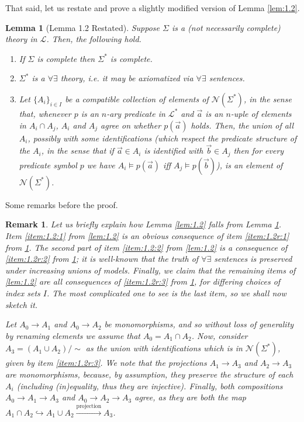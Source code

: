 \documentclass{article}
\newtheorem{lemma}[theorem]{Lemma}
\newtheorem{remark}[theorem]{Remark}
\theoremstyle{nonumberplain}
\newcommand{\Lang}{\mathcal{L}}
\newcommand{\calN}{\mathcal{N}}
\begin{document}
That said, let us restate and prove a slightly modified version of Lemma \ref{lem:1.2}.

\begin{lemma}[Lemma 1.2 Restated]\label{lem:1.2r}
Suppose $\Sigma$ is a (not necessarily complete) theory in $\Lang$. Then, the following hold.
\begin{enumerate}
\item\label{item:1.2r:1} If $\Sigma$ is complete then $\Sigma^*$ is complete.
\item\label{item:1.2r:2} $\Sigma^*$ is a $\forall \exists$ theory, i.e. it may be axiomatized via $\forall\exists$ sentences.
\item\label{item:1.2r:3} Let $\{A_i\}_{i \in I}$ be a compatible collection of elements of $\calN(\Sigma^*)$, in the sense that, whenever $p$ is an $n$-ary predicate in $\Lang^*$ and $\vec a$ is an $n$-uple of elements in $A_i \cap A_j$, $A_i$ and $A_j$ agree on whether $p(\vec a)$ holds. Then, the union of all $A_i$, possibly with some identifications (which respect the predicate structure of the $A_i$, in the sense that if $\vec a \in A_i$ is identified with $\vec b \in A_j$ then for every predicate symbol $p$ we have $A_i \vDash p(\vec a)$ iff $A_j \vDash p(\vec b)$), is an element of $\calN(\Sigma^*)$.
\end{enumerate}
\end{lemma}

Some remarks before the proof.

\begin{remark}
Let us briefly explain how Lemma \ref{lem:1.2} falls from Lemma \ref{lem:1.2r}. Item \ref{item:1.2:1} from \ref{lem:1.2} is an obvious consequence of item \ref{item:1.2r:1} from \ref{lem:1.2r}. The second part of item \ref{item:1.2:2} from \ref{lem:1.2} is a consequence of \ref{item:1.2r:2} from \ref{lem:1.2r}; it is well-known that the truth of $\forall\exists$ sentences is preserved under increasing unions of models. Finally, we claim that the remaining items of \ref{lem:1.2} are all consequences of \ref{item:1.2r:3} from \ref{lem:1.2r}, for differing choices of index sets $I$. The most complicated one to see is the last item, so we shall now sketch it.

Let $A_0 \to A_1$ and $A_0 \to A_2$ be monomorphisms, and so without loss of generality by renaming elements we assume that $A_0 = A_1 \cap A_2$. Now, consider $A_3 = (A_1 \cup A_2)/\sim$ as the union with identifications which is in $\calN(\Sigma^*)$, given by item \ref{item:1.2r:3}. We note that the projections $A_1 \to A_3$ and $A_2 \to A_3$ are monomorphisms, because, by assumption, they preserve the structure of each $A_i$ (including (in)equality, thus they are injective). Finally, both compositions $A_0 \to A_1 \to A_3$ and $A_0 \to A_2 \to A_3$ agree, as they are both the map ${A_1 \cap A_2 \hookrightarrow A_1 \cup A_2 \xrightarrow{\text{projection}} A_3}$.
\end{remark}
\end{document}
